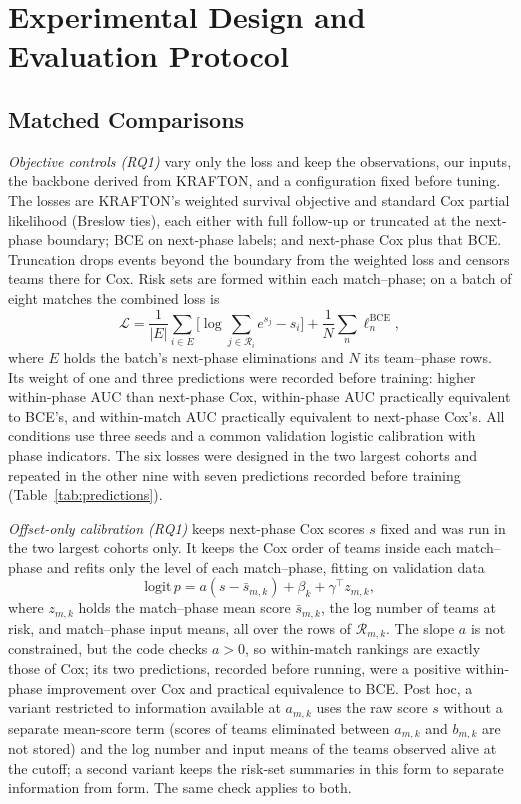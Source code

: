 \documentclass[sigconf,anonymous]{acmart}
\begin{document}
\section{Experimental Design and Evaluation Protocol}
\label{sec:method:evaluation}
\subsection{Matched Comparisons}
\label{sec:method:decomposition}
\emph{Objective controls (RQ1)} vary only the loss and keep the observations, our inputs, the backbone derived from KRAFTON, and a configuration fixed before tuning. The losses are KRAFTON's weighted survival objective and standard Cox partial likelihood (Breslow ties), each either with full follow-up or truncated at the next-phase boundary; BCE on next-phase labels; and next-phase Cox plus that BCE. Truncation drops events beyond the boundary from the weighted loss and censors teams there for Cox. Risk sets are formed within each match--phase; on a batch of eight matches the combined loss is
\begin{equation}
\mathcal{L}=\frac{1}{|E|}\sum_{i\in E}\Big[\log\sum_{j\in\mathcal{R}_i}e^{s_j}-s_i\Big]+\frac{1}{N}\sum_{n}\ell^{\mathrm{BCE}}_n,
\label{eq:combined}
\end{equation}
where $E$ holds the batch's next-phase eliminations and $N$ its team--phase rows. Its weight of one and three predictions were recorded before training: higher within-phase AUC than next-phase Cox, within-phase AUC practically equivalent to BCE's, and within-match AUC practically equivalent to next-phase Cox's. All conditions use three seeds and a common validation logistic calibration with phase indicators. The six losses were designed in the two largest cohorts and repeated in the other nine with seven predictions recorded before training (Table~\ref{tab:predictions}).

\emph{Offset-only calibration (RQ1)} keeps next-phase Cox scores $s$ fixed and was run in the two largest cohorts only. It keeps the Cox order of teams inside each match--phase and refits only the level of each match--phase, fitting on validation data
\begin{equation}
\mathrm{logit}\,p=a(s-\bar s_{m,k})+\beta_k+\gamma^{\top}z_{m,k},
\label{eq:offset}
\end{equation}
where $z_{m,k}$ holds the match--phase mean score $\bar s_{m,k}$, the log number of teams at risk, and match--phase input means, all over the rows of $\mathcal{R}_{m,k}$. The slope $a$ is not constrained, but the code checks $a>0$, so within-match rankings are exactly those of Cox; its two predictions, recorded before running, were a positive within-phase improvement over Cox and practical equivalence to BCE. Post hoc, a variant restricted to information available at $a_{m,k}$ uses the raw score $s$ without a separate mean-score term (scores of teams eliminated between $a_{m,k}$ and $b_{m,k}$ are not stored) and the log number and input means of the teams observed alive at the cutoff; a second variant keeps the risk-set summaries in this form to separate information from form. The same check applies to both.
\end{document}
